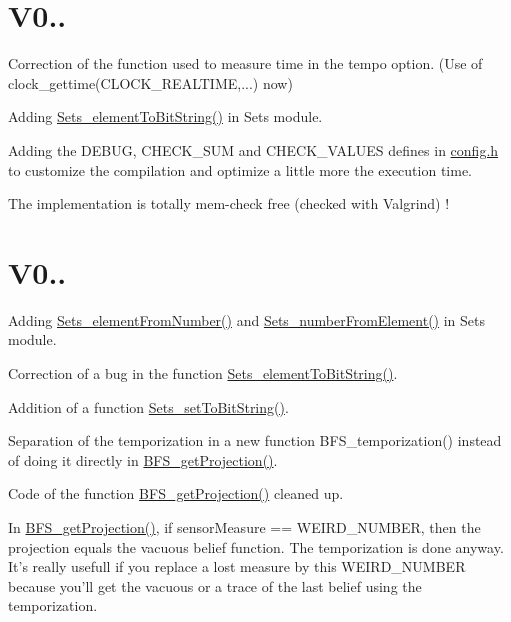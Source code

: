 \hypertarget{version_sec_v04_1_subsec}{}\section{V0..}\label{version_sec_v04_1_subsec}
Correction of the function used to measure time in the tempo option. (Use of clock\-\_\-gettime(C\-L\-O\-C\-K\-\_\-\-R\-E\-A\-L\-T\-I\-M\-E,...) now) \par
 Adding \hyperlink{_sets_8c_a7693e000c2760240139628cd1b33d2f1}{Sets\-\_\-element\-To\-Bit\-String()} in Sets module. \par
 Adding the D\-E\-B\-U\-G, C\-H\-E\-C\-K\-\_\-\-S\-U\-M and C\-H\-E\-C\-K\-\_\-\-V\-A\-L\-U\-E\-S defines in \hyperlink{config_8h}{config.\-h} to customize the compilation and optimize a little more the execution time. \par
 The implementation is totally mem-\/check free (checked with Valgrind) !\hypertarget{version_sec_v04_2_subsec}{}\section{V0..}\label{version_sec_v04_2_subsec}
Adding \hyperlink{_sets_8c_ab9ee97ae54608f3fb5784b29503d62b6}{Sets\-\_\-element\-From\-Number()} and \hyperlink{_sets_8c_a71aeb52bad651c5129b57d7e69e5f480}{Sets\-\_\-number\-From\-Element()} in Sets module. \par
 Correction of a bug in the function \hyperlink{_sets_8c_a7693e000c2760240139628cd1b33d2f1}{Sets\-\_\-element\-To\-Bit\-String()}. \par
 Addition of a function \hyperlink{_sets_8c_a76fd7c759c8e24d17fdc240cc003c969}{Sets\-\_\-set\-To\-Bit\-String()}. \par
 Separation of the temporization in a new function B\-F\-S\-\_\-temporization() instead of doing it directly in \hyperlink{_beliefs_from_sensors_8c_a0e545c6a35093eb43b27325db61c2216}{B\-F\-S\-\_\-get\-Projection()}. \par
 Code of the function \hyperlink{_beliefs_from_sensors_8c_a0e545c6a35093eb43b27325db61c2216}{B\-F\-S\-\_\-get\-Projection()} cleaned up. \par
 In \hyperlink{_beliefs_from_sensors_8c_a0e545c6a35093eb43b27325db61c2216}{B\-F\-S\-\_\-get\-Projection()}, if sensor\-Measure == W\-E\-I\-R\-D\-\_\-\-N\-U\-M\-B\-E\-R, then the projection equals the vacuous belief function. The temporization is done anyway. It's really usefull if you replace a lost measure by this W\-E\-I\-R\-D\-\_\-\-N\-U\-M\-B\-E\-R because you'll get the vacuous or a trace of the last belief using the temporization. \par
